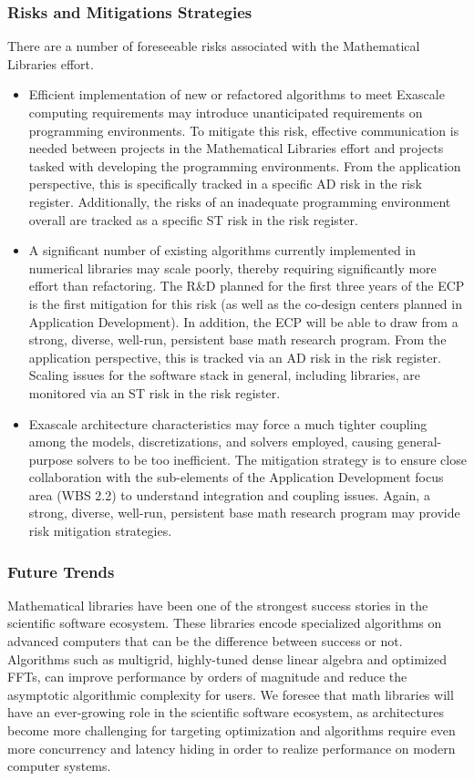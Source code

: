 \subsubsection{Risks and Mitigations Strategies}
There are a number of foreseeable risks associated with the Mathematical Libraries effort.
\begin{itemize}
\item Efficient implementation of new or refactored algorithms to meet Exascale computing requirements may introduce unanticipated requirements on programming environments. To mitigate this risk, effective communication is needed between projects in the Mathematical Libraries effort and projects tasked with developing the programming environments. From the application perspective, this is specifically tracked in a specific AD risk
  in the risk register. Additionally, the risks of an inadequate programming environment overall are tracked as a specific ST risk in the risk register.
	\item A significant number of existing algorithms currently implemented in numerical libraries may scale poorly, thereby requiring significantly more effort than refactoring. The R\&D planned for the first three years of the ECP is the first mitigation for this risk (as well as the co-design centers planned in Application Development). In addition, the ECP will be able to draw from a strong, diverse, well-run, persistent base math research program. From the application perspective, this is tracked via an AD risk in the risk register. Scaling issues for the software stack in general, including libraries, are monitored via an ST risk in the risk register.
	\item Exascale architecture characteristics may force a much tighter coupling among the models, discretizations, and solvers employed, causing general-purpose solvers to be too inefficient. The mitigation strategy is to ensure close collaboration with the sub-elements of the Application Development focus area (WBS 2.2) to understand integration and coupling issues. Again, a strong, diverse, well-run, persistent base math research program may provide risk mitigation strategies.
\end{itemize}

\subsubsection{Future Trends}
Mathematical libraries have been one of the strongest success stories in the scientific software ecosystem.  These libraries encode specialized algorithms on advanced computers that can be the difference between success or not.  Algorithms such as multigrid, highly-tuned dense linear algebra and optimized FFTs, can improve performance by orders of magnitude and reduce the asymptotic algorithmic complexity for users.  We foresee that math libraries will have an ever-growing role in the scientific software ecosystem, as architectures become more challenging for targeting optimization and algorithms require even more concurrency and latency hiding in order to realize performance on modern computer systems.

